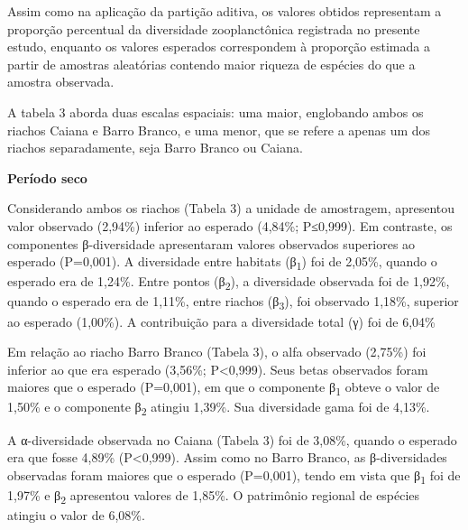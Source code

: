 \documentclass[
  letterpaper,
  DIV=11,
  numbers=noendperiod]{scrartcl}
\begin{document}
Assim como na aplicação da partição aditiva, os valores obtidos
representam a proporção percentual da diversidade zooplanctônica
registrada no presente estudo, enquanto os valores esperados
correspondem à proporção estimada a partir de amostras aleatórias
contendo maior riqueza de espécies do que a amostra observada.

A tabela 3 aborda duas escalas espaciais: uma maior, englobando ambos os
riachos Caiana e Barro Branco, e uma menor, que se refere a apenas um
dos riachos separadamente, seja Barro Branco ou Caiana.

\textbf{Período seco}

Considerando ambos os riachos (Tabela 3) a unidade de amostragem,
apresentou valor observado (2,94\%) inferior ao esperado (4,84\%;
P≤0,999). Em contraste, os componentes β-diversidade apresentaram
valores observados superiores ao esperado (P=0,001). A diversidade entre
habitats (β\textsubscript{1}) foi de 2,05\%, quando o esperado era de
1,24\%. Entre pontos (β\textsubscript{2}), a diversidade observada foi
de 1,92\%, quando o esperado era de 1,11\%, entre riachos
(β\textsubscript{3}), foi observado 1,18\%, superior ao esperado
(1,00\%). A contribuição para a diversidade total (γ) foi de 6,04\%

Em relação ao riacho Barro Branco (Tabela 3), o alfa observado (2,75\%)
foi inferior ao que era esperado (3,56\%; P\textless0,999). Seus betas
observados foram maiores que o esperado (P=0,001), em que o componente
β\textsubscript{1} obteve o valor de 1,50\% e o componente
β\textsubscript{2} atingiu 1,39\%. Sua diversidade gama foi de 4,13\%.

A α-diversidade observada no Caiana (Tabela 3) foi de 3,08\%, quando o
esperado era que fosse 4,89\% (P\textless0,999). Assim como no Barro
Branco, as β-diversidades observadas foram maiores que o esperado
(P=0,001), tendo em vista que β\textsubscript{1} foi de 1,97\% e
β\textsubscript{2} apresentou valores de 1,85\%. O patrimônio regional
de espécies atingiu o valor de 6,08\%.
\end{document}
